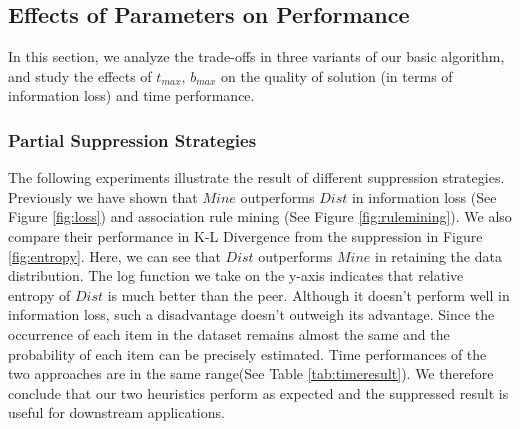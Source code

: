 \subsection{Effects of Parameters on Performance}\label{sec:eval:effect}
In this section, we analyze the trade-offs in three variants of our basic
algorithm, and study the effects of $t_{max}$, $b_{max}$ on the
quality of solution (in terms of information loss) and time performance.

\subsubsection{Partial Suppression Strategies}\label{sec:eval:partialsuppression}
The following experiments illustrate the result of different suppression
strategies.
Previously we have shown that $Mine$ outperforms
$Dist$ in information loss (See Figure
\ref{fig:loss}) and association rule
mining (See Figure \ref{fig:rulemining}). We also compare their performance
in K-L Divergence from the suppression in Figure \ref{fig:entropy}.
Here, we can see that $Dist$ outperforms $Mine$ in
retaining the data distribution. The log function we take on the
y-axis indicates that relative entropy of $Dist$ is much better than the peer.
Although it doesn't perform well
in information loss, such a disadvantage doesn't outweigh its advantage.
Since the occurrence of each item in the dataset remains almost the same and
the probability of each item can be precisely estimated. Time performances of
the two approaches are in the same range(See Table \ref{tab:timeresult}).
We therefore conclude that our two heuristics perform as expected
and the suppressed result is useful for downstream applications.
%

